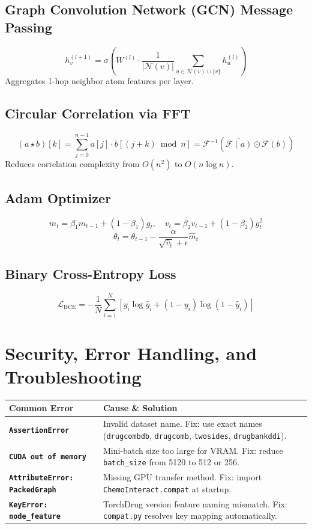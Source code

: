 \documentclass[12pt,a4paper,oneside]{article}
\begin{document}
\subsection{Graph Convolution Network (GCN) Message Passing}
\[
h_v^{(l+1)} = \sigma \left( W^{(l)} \cdot \frac{1}{|\mathcal{N}(v)|} \sum_{u \in \mathcal{N}(v) \cup \{v\}} h_u^{(l)} \right)
\]
Aggregates 1-hop neighbor atom features per layer.

\subsection{Circular Correlation via FFT}
\[
(a \star b)[k] = \sum_{j=0}^{n-1} a[j] \cdot b[(j+k) \bmod n] = \mathcal{F}^{-1}\left( \overline{\mathcal{F}(a)} \odot \mathcal{F}(b) \right)
\]
Reduces correlation complexity from $O(n^2)$ to $O(n \log n)$.

\subsection{Adam Optimizer}
\[
m_t = \beta_1 m_{t-1} + (1-\beta_1)g_t, \quad v_t = \beta_2 v_{t-1} + (1-\beta_2)g_t^2
\]
\[
\theta_t = \theta_{t-1} - \frac{\alpha}{\sqrt{\hat{v}_t} + \epsilon} \hat{m}_t
\]

\subsection{Binary Cross-Entropy Loss}
\[
\mathcal{L}_{\text{BCE}} = -\frac{1}{N} \sum_{i=1}^N \left[ y_i \log \hat{y}_i + (1 - y_i) \log (1 - \hat{y}_i) \right]
\]

\section{Security, Error Handling, and Troubleshooting}\label{sec:security}

\begin{longtable}{>{\bfseries}p{4cm}p{10.5cm}}
\toprule
Common Error & Cause \& Solution \\
\midrule\endhead
\texttt{AssertionError} & Invalid dataset name. Fix: use exact names (\texttt{drugcombdb}, \texttt{drugcomb}, \texttt{twosides}, \texttt{drugbankddi}). \\
\midrule
\texttt{CUDA out of memory} & Mini-batch size too large for VRAM. Fix: reduce \texttt{batch\_size} from 5120 to 512 or 256. \\
\midrule
\texttt{AttributeError: PackedGraph} & Missing GPU transfer method. Fix: import \texttt{ChemoInteract.compat} at startup. \\
\midrule
\texttt{KeyError: node\_feature} & TorchDrug version feature naming mismatch. Fix: \texttt{compat.py} resolves key mapping automatically. \\
\bottomrule
\end{longtable}
\end{document}
